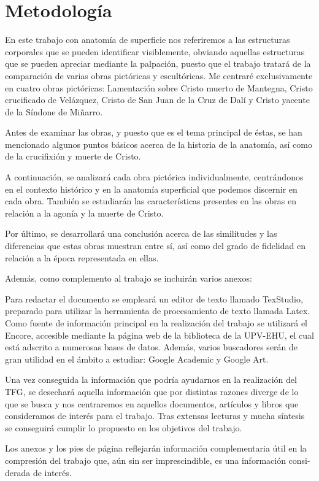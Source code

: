 \section{Metodología}
En este trabajo con anatomía de superficie nos referiremos a las estructuras corporales que se pueden identificar visiblemente, obviando aquellas estructuras que se pueden apreciar mediante la palpación, puesto que el trabajo tratará de la comparación de varias obras pictóricas y escultóricas. Me centraré exclusivamente en cuatro obras pictóricas: Lamentación sobre Cristo muerto de Mantegna, Cristo crucificado de Velázquez,  %
Cristo de San Juan de la Cruz de Dalí y Cristo yacente de la Síndone de Miñarro.


Antes de examinar las obras, y puesto que es el tema principal de éstas, se han mencionado algunos puntos básicos acerca de la historia de la anatomía, así como de la crucifixión y muerte de Cristo.

A continuación, se analizará cada obra pictórica individualmente, centrándonos en el contexto histórico y en la anatomía superficial que podemos discernir en cada obra. También se estudiarán las características presentes en las obras en relación a la agonía y la muerte de Cristo.

Por último, se desarrollará una conclusión acerca de las similitudes y las diferencias que estas obras muestran entre sí, así como del grado de fidelidad en relación a la época representada en ellas.

Además, como complemento al trabajo se incluirán varios anexos:

\vspace{12pt}

Para redactar el documento se empleará un editor de texto llamado TexStudio, preparado para utilizar la herramienta de procesamiento de texto llamada Latex. Como fuente de información principal en la realización del trabajo se utilizará el Encore, accesible mediante la página web de la biblioteca de la UPV-EHU, el cual está adscrito a numerosas bases de datos. Además, varios buscadores serán de gran utilidad en el ámbito a estudiar: Google Academic y Google Art.

Una vez conseguida la información que podría ayudarnos en la realización del TFG, se desechará aquella información que por distintas razones diverge de lo que se busca y nos centraremos en aquellos documentos, artículos y libros que consideramos de interés para el trabajo. Tras extensas lecturas y mucha síntesis se conseguirá cumplir lo propuesto en los objetivos del trabajo.

Los anexos y los pies de página reflejarán información complementaria útil en la compresión del trabajo que, aún sin ser imprescindible, es una información  consi-derada de interés.